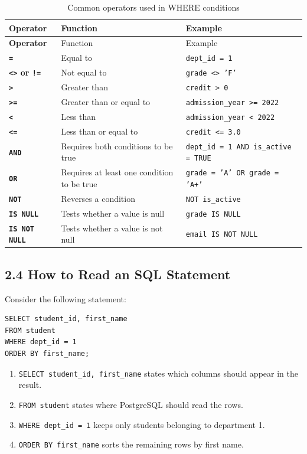 \documentclass[12pt,a4paper]{article}
\begin{document}
\begingroup
{}
\small
\renewcommand{\arraystretch}{1.25}
\begin{longtable}{>{\bfseries}p{2.7cm} p{4.7cm} p{5.1cm}}
\caption{Common operators used in WHERE conditions}
\label{tab:where_operators}\\
\toprule
Operator & Function & Example \\
\midrule
\endfirsthead
\toprule
Operator & Function & Example \\
\midrule
\endhead
\bottomrule
\endfoot
\texttt{=} & Equal to & \texttt{dept\_id = 1} \\
\texttt{<>} or \texttt{!=} & Not equal to & \texttt{grade <> 'F'} \\
\texttt{>} & Greater than & \texttt{credit > 0} \\
\texttt{>=} & Greater than or equal to & \texttt{admission\_year >= 2022} \\
\texttt{<} & Less than & \texttt{admission\_year < 2022} \\
\texttt{<=} & Less than or equal to & \texttt{credit <= 3.0} \\
\texttt{AND} & Requires both conditions to be true & \texttt{dept\_id = 1 AND is\_active = TRUE} \\
\texttt{OR} & Requires at least one condition to be true & \texttt{grade = 'A' OR grade = 'A+'} \\
\texttt{NOT} & Reverses a condition & \texttt{NOT is\_active} \\
\texttt{IS NULL} & Tests whether a value is null & \texttt{grade IS NULL} \\
\texttt{IS NOT NULL} & Tests whether a value is not null & \texttt{email IS NOT NULL} \\
\end{longtable}
\endgroup

\subsection*{2.4 How to Read an SQL Statement}
Consider the following statement:

\begin{verbatim}
SELECT student_id, first_name
FROM student
WHERE dept_id = 1
ORDER BY first_name;
\end{verbatim}

\begin{enumerate}
    \item \texttt{SELECT student\_id, first\_name} states which columns should appear in the result.
    \item \texttt{FROM student} states where PostgreSQL should read the rows.
    \item \texttt{WHERE dept\_id = 1} keeps only students belonging to department 1.
    \item \texttt{ORDER BY first\_name} sorts the remaining rows by first name.
\end{enumerate}
\end{document}
